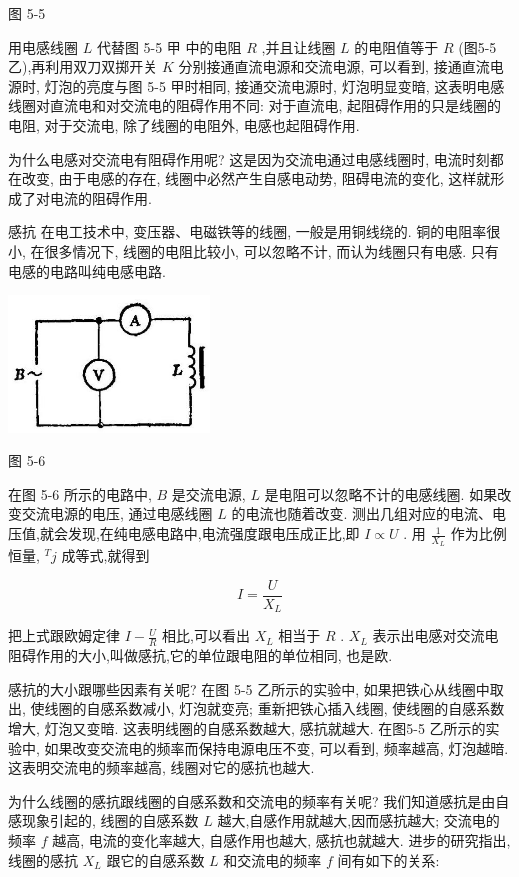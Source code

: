 \documentclass[10pt]{article}
\begin{document}
图 5-5

用电感线圈 \(L\) 代替图 5-5 甲 中的电阻 \(R\) ,并且让线圈 \(L\) 的电阻值等于 \(R\) (图5-5乙),再利用双刀双掷开关 \(K\) 分别接通直流电源和交流电源, 可以看到, 接通直流电源时, 灯泡的亮度与图 5-5 甲时相同, 接通交流电源时, 灯泡明显变暗, 这表明电感线圈对直流电和对交流电的阻碍作用不同: 对于直流电, 起阻碍作用的只是线圈的电阻, 对于交流电, 除了线圈的电阻外, 电感也起阻碍作用.

为什么电感对交流电有阻碍作用呢? 这是因为交流电通过电感线圈时, 电流时刻都在改变, 由于电感的存在, 线圈中必然产生自感电动势, 阻碍电流的变化, 这样就形成了对电流的阻碍作用.

感抗 在电工技术中, 变压器、电磁铁等的线圈, 一般是用铜线绕的. 铜的电阻率很小, 在很多情况下, 线圈的电阻比较小, 可以忽略不计, 而认为线圈只有电感. 只有电感的电路叫纯电感电路.

\begin{center}
\includegraphics[max width=0.4\textwidth]{images/01913056-1f15-74d8-9184-9aab52c9d66b_168_331839.jpg}
\end{center}

图 5-6

在图 5-6 所示的电路中, \(B\) 是交流电源, \(L\) 是电阻可以忽略不计的电感线圈. 如果改变交流电源的电压, 通过电感线圈 \(L\) 的电流也随着改变. 测出几组对应的电流、电压值,就会发现,在纯电感电路中,电流强度跟电压成正比,即 \(I \propto U\) . 用 \(\frac{1}{{X}_{L}}\) 作为比例恒量, \({}^{T}j\) 成等式,就得到

\[
I = \frac{U}{{X}_{L}}
\]

把上式跟欧姆定律 \(I - \frac{U}{R}\) 相比,可以看出 \({X}_{L}\) 相当于 \(R\) . \({X}_{L}\) 表示出电感对交流电阻碍作用的大小,叫做感抗,它的单位跟电阻的单位相同, 也是欧.

感抗的大小跟哪些因素有关呢? 在图 5-5 乙所示的实验中, 如果把铁心从线圈中取出, 使线圈的自感系数减小, 灯泡就变亮; 重新把铁心插入线圈, 使线圈的自感系数增大, 灯泡又变暗. 这表明线圈的自感系数越大, 感抗就越大. 在图5-5 乙所示的实验中, 如果改变交流电的频率而保持电源电压不变, 可以看到, 频率越高, 灯泡越暗. 这表明交流电的频率越高, 线圈对它的感抗也越大.

为什么线圈的感抗跟线圈的自感系数和交流电的频率有关呢? 我们知道感抗是由自感现象引起的, 线圈的自感系数 \(L\) 越大,自感作用就越大,因而感抗越大; 交流电的频率 \(f\) 越高, 电流的变化率越大, 自感作用也越大, 感抗也就越大. 进步的研究指出,线圈的感抗 \({X}_{L}\) 跟它的自感系数 \(L\) 和交流电的频率 \(f\) 间有如下的关系:
\end{document}
